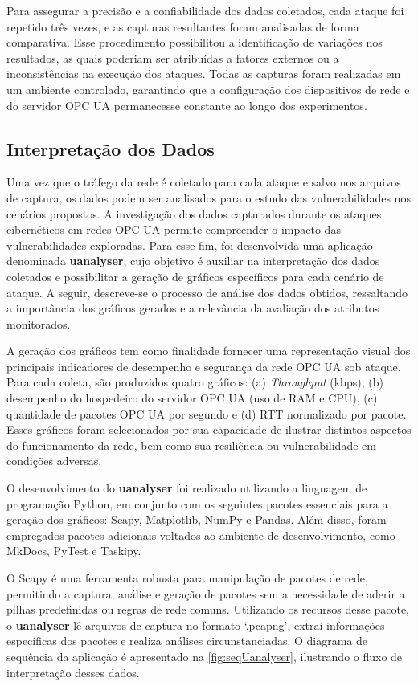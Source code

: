         Para assegurar a precisão e a confiabilidade dos dados coletados, cada ataque foi repetido três vezes, e as capturas resultantes foram analisadas de forma comparativa. Esse procedimento possibilitou a identificação de variações nos resultados, as quais poderiam ser atribuídas a fatores externos ou a inconsistências na execução dos ataques. Todas as capturas foram realizadas em um ambiente controlado, garantindo que a configuração dos dispositivos de rede e do servidor OPC UA permanecesse constante ao longo dos experimentos.

    \subsection{Interpretação dos Dados}

        Uma vez que o tráfego da rede é coletado para cada ataque e salvo nos arquivos de captura, os dados podem ser analisados para o estudo das vulnerabilidades nos cenários propostos. A investigação dos dados capturados durante os ataques cibernéticos em redes OPC UA permite compreender o impacto das vulnerabilidades exploradas. Para esse fim, foi desenvolvida uma aplicação denominada \textbf{uanalyser}, cujo objetivo é auxiliar na interpretação dos dados coletados e possibilitar a geração de gráficos específicos para cada cenário de ataque. A seguir, descreve-se o processo de análise dos dados obtidos, ressaltando a importância dos gráficos gerados e a relevância da avaliação dos atributos monitorados.

        A geração dos gráficos tem como finalidade fornecer uma representação visual dos principais indicadores de desempenho e segurança da rede OPC UA sob ataque. Para cada coleta, são produzidos quatro gráficos: (a) \textit{Throughput} (kbps), (b) desempenho do hospedeiro do servidor OPC UA (uso de RAM e CPU), (c) quantidade de pacotes OPC UA por segundo e (d) RTT normalizado por pacote. Esses gráficos foram selecionados por sua capacidade de ilustrar distintos aspectos do funcionamento da rede, bem como sua resiliência ou vulnerabilidade em condições adversas.
        
        O desenvolvimento do \textbf{uanalyser} foi realizado utilizando a linguagem de programação Python, em conjunto com os seguintes pacotes essenciais para a geração dos gráficos: Scapy, Matplotlib, NumPy e Pandas. Além disso, foram empregados pacotes adicionais voltados ao ambiente de desenvolvimento, como MkDocs, PyTest e Taskipy.
        
        O Scapy é uma ferramenta robusta para manipulação de pacotes de rede, permitindo a captura, análise e geração de pacotes sem a necessidade de aderir a pilhas predefinidas ou regras de rede comuns. Utilizando os recursos desse pacote, o \textbf{uanalyser} lê arquivos de captura no formato `.pcapng', extrai informações específicas dos pacotes e realiza análises circunstanciadas. O diagrama de sequência da aplicação é apresentado na \autoref{fig:seqUanalyser}, ilustrando o fluxo de interpretação desses dados. %

